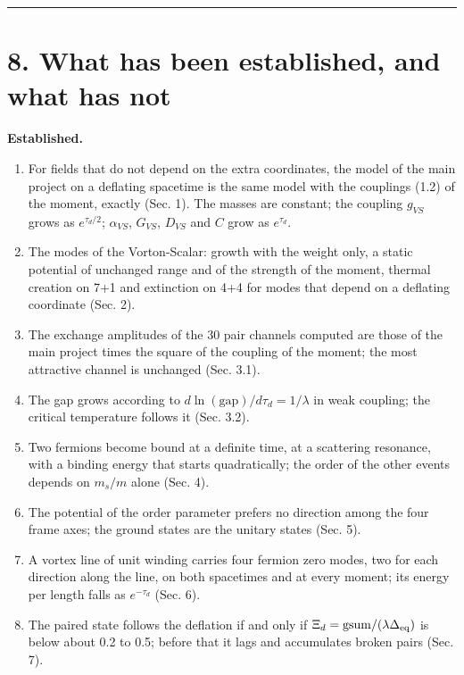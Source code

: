 \documentclass[
  10pt,
]{article}
\providecommand{\tightlist}{%
  \setlength{\itemsep}{0pt}\setlength{\parskip}{0pt}}
\begin{document}
\begin{center}\rule{0.5\linewidth}{0.5pt}\end{center}

\hypertarget{what-has-been-established-and-what-has-not}{%
\section{8. What has been established, and what has
not}\label{what-has-been-established-and-what-has-not}}

\textbf{Established.}

\begin{enumerate}
\def\labelenumi{\arabic{enumi}.}
\tightlist
\item
  For fields that do not depend on the extra coordinates, the model of
  the main project on a deflating spacetime is the same model with the
  couplings (1.2) of the moment, exactly (Sec. 1). The masses are
  constant; the coupling \(g_{VS}\) grows as \(e^{\tau_d/2}\);
  \(\alpha_{VS}\), \(G_{VS}\), \(D_{VS}\) and \(C\) grow as
  \(e^{\tau_d}\).
\item
  The modes of the Vorton-Scalar: growth with the weight only, a static
  potential of unchanged range and of the strength of the moment,
  thermal creation on 7+1 and extinction on 4+4 for modes that depend on
  a deflating coordinate (Sec. 2).
\item
  The exchange amplitudes of the 30 pair channels computed are those of
  the main project times the square of the coupling of the moment; the
  most attractive channel is unchanged (Sec. 3.1).
\item
  The gap grows according to \(d\ln(\mathrm{gap})/d\tau_d=1/\lambda\) in
  weak coupling; the critical temperature follows it (Sec. 3.2).
\item
  Two fermions become bound at a definite time, at a scattering
  resonance, with a binding energy that starts quadratically; the order
  of the other events depends on \(m_s/m\) alone (Sec. 4).
\item
  The potential of the order parameter prefers no direction among the
  four frame axes; the ground states are the unitary states (Sec. 5).
\item
  A vortex line of unit winding carries four fermion zero modes, two for
  each direction along the line, on both spacetimes and at every moment;
  its energy per length falls as \(e^{-\tau_d}\) (Sec. 6).
\item
  The paired state follows the deflation if and only if
  \(\Xi_d=\mathrm{gsum}/(\lambda\Delta_{\rm eq})\) is below about 0.2 to
  0.5; before that it lags and accumulates broken pairs (Sec. 7).
\end{enumerate}
\end{document}
